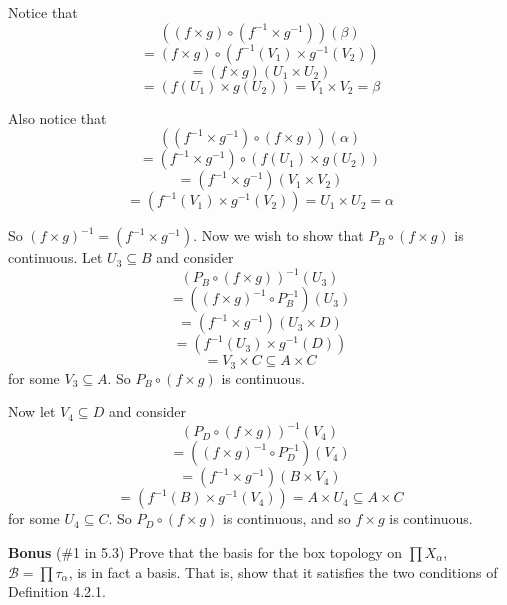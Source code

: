 \documentclass[12pt]{article}
\begin{document}
\begin{enumerate}
Notice that
\[((f \times g) \circ (f^{-1} \times g^{-1}))(\beta)\]
\[=(f \times g) \circ (f^{-1}(V_1) \times g^{-1}(V_2))\]
\[=(f \times g) (U_1 \times U_2)\]
\[= (f(U_1) \times g(U_2)) = V_1 \times V_2 = \beta\]

Also notice that
\[((f^{-1} \times g^{-1}) \circ (f \times g))(\alpha)\]
\[= (f^{-1} \times g^{-1}) \circ (f(U_1) \times g(U_2))\]
\[= (f^{-1} \times g^{-1}) (V_1 \times V_2)\]
\[= (f^{-1}(V_1) \times g^{-1}(V_2)) = U_1 \times U_2 = \alpha\]

So $(f \times g)^{-1} = (f^{-1} \times g^{-1})$. Now we wish to show that $P_B \circ (f \times g)$ is continuous. Let $U_3 \subseteq B$ and consider
\[(P_B \circ (f \times g))^{-1}(U_3)\]
\[ = ((f \times g)^{-1} \circ P_B^{-1})(U_3)\]
\[ = (f^{-1} \times g^{-1}) (U_3 \times D)\]
\[ = (f^{-1}(U_3) \times g^{-1}(D))\]
\[ = V_3 \times C \subseteq A \times C\]
for some $V_3 \subseteq A$. So $P_B \circ (f \times g)$ is continuous.

Now let $V_4 \subseteq D$ and consider
\[(P_D \circ (f \times g))^{-1}(V_4)\]
\[ = ((f \times g)^{-1} \circ P_D^{-1})(V_4)\]
\[ = (f^{-1} \times g^{-1})(B \times V_4)\]
\[ = (f^{-1}(B) \times g^{-1}(V_4)) = A \times U_4 \subseteq A \times C\]
for some $U_4 \subseteq C$. So $P_D \circ (f \times g)$ is continuous, and so $f \times g$ is continuous.





\end{enumerate}



\noindent \textbf{Bonus}  (\#1 in 5.3) Prove that the basis for the box topology on $\prod X_{\alpha}$, $\mathcal{B}=\prod \tau_{\alpha}$, is in fact a basis. That is, show that it satisfies the two conditions of Definition 4.2.1.
\end{document}

